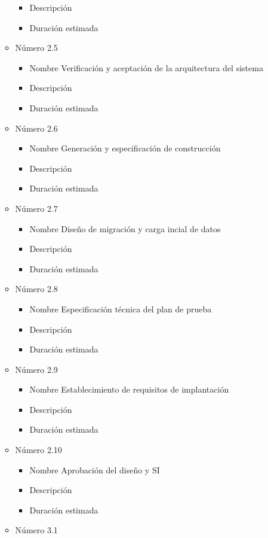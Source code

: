 \documentclass[11pt,a4paper,spanish,twoside]{report}
\begin{document}
\begin{itemize}
\begin{itemize}
\begin{itemize}
\item{Descripción}
\item{Duración estimada} 
\end{itemize}
\item{Número} 2.5
\begin{itemize}
\item{Nombre} Verificación y aceptación de la arquitectura del sistema
\item{Descripción}
\item{Duración estimada} 
\end{itemize}
\item{Número} 2.6
\begin{itemize}
\item{Nombre} Generación y especificación de construcción
\item{Descripción}
\item{Duración estimada} 
\end{itemize}
\item{Número} 2.7
\begin{itemize}
\item{Nombre} Diseño de migración y carga incial de datos
\item{Descripción}
\item{Duración estimada} 
\end{itemize}
\item{Número} 2.8
\begin{itemize}
\item{Nombre} Especificación técnica del plan de prueba
\item{Descripción}
\item{Duración estimada} 
\end{itemize}
\item{Número} 2.9
\begin{itemize}
\item{Nombre} Establecimiento de requisitos de implantación
\item{Descripción}
\item{Duración estimada} 
\end{itemize}
\item{Número} 2.10
\begin{itemize}
\item{Nombre} Aprobación del diseño y SI
\item{Descripción}
\item{Duración estimada} 
\end{itemize}
\item{Número} 3.1
\begin{itemize}

\end{itemize}
\end{itemize}
\end{itemize}
\end{document}
